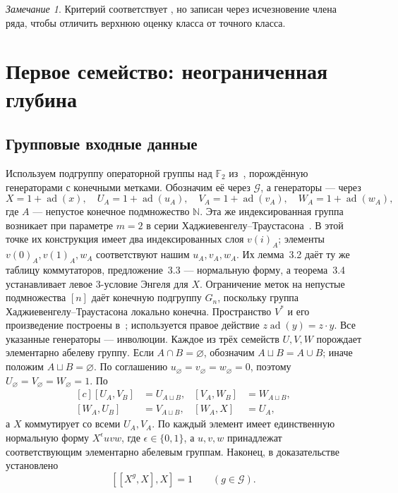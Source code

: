 \documentclass[11pt,a4paper]{article}
\theoremstyle{definition}
\theoremstyle{remark}
\newtheorem{remark}[theorem]{Замечание}
\newcommand{\ad}{\operatorname{ad}}
\newcommand{\F}{\mathbb F}
\begin{document}
\begin{remark}
Критерий соответствует \cite[предложение~3.2]{BCNW},
но записан через исчезновение члена ряда, чтобы отличить
верхнюю оценку класса от точного класса.
\end{remark}

\section{Первое семейство: неограниченная глубина}
\label{sec:first}

\subsection{Групповые входные данные}

Используем подгруппу операторной группы над \(\F_2\) из~\cite{NTT},
порождённую генераторами с конечными метками. Обозначим её
через \(\mathscr G\), а генераторы --- через
\[
 X=1+\ad(x),\quad U_A=1+\ad(u_A),\quad
 V_A=1+\ad(v_A),\quad W_A=1+\ad(w_A),
\]
где \(A\) --- непустое конечное подмножество \(\mathbb N\).
Эта же индексированная группа возникает при параметре \(m=2\)
в серии Хаджиевенгелу--Траустасона~\cite{HT}. В этой точке их конструкция
имеет два индексированных слоя \(v(i)_A\); элементы
\(v(0)_A,v(1)_A,w_A\) соответствуют нашим \(u_A,v_A,w_A\).
Их лемма~3.2 даёт ту же таблицу коммутаторов,
предложение~3.3 --- нормальную форму, а теорема~3.4 устанавливает
левое \(3\)-условие Энгеля для \(X\). Ограничение меток на непустые
подмножества \([n]\) даёт конечную подгруппу \(G_n\), поскольку
группа Хаджиевенгелу--Траустасона локально конечна.
Пространство \(V^*\) и его произведение построены
в~\cite[раздел~2, перед леммой~2.2]{NTT}; используется правое действие
\(z\ad(y)=z\cdot y\).
Все указанные генераторы --- инволюции.
Каждое из трёх семейств \(U,V,W\) порождает элементарно абелеву группу.
Если \(A\cap B=\varnothing\), обозначим \(A\sqcup B=A\cup B\);
иначе положим \(A\sqcup B=\varnothing\).
По соглашению \(u_\varnothing=v_\varnothing=w_\varnothing=0\),
поэтому \(U_\varnothing=V_\varnothing=W_\varnothing=1\).
По \cite[лемма~2.3]{NTT}
\begin{equation}\label{eq:nttcomm}
 \begin{aligned}[c]
 [U_A,V_B]&=U_{A\sqcup B},&
 [V_A,W_B]&=W_{A\sqcup B},\\
 [W_A,U_B]&=V_{A\sqcup B},&
 [W_A,X]&=U_A,
 \end{aligned}
\end{equation}
а \(X\) коммутирует со всеми \(U_A,V_A\).
По \cite[предложение~2.4]{NTT} каждый элемент имеет
единственную нормальную форму \(X^\epsilon uvw\),
где \(\epsilon\in\{0,1\}\), а \(u,v,w\) принадлежат
соответствующим элементарно абелевым группам.
Наконец, в доказательстве \cite[теорема~2.5]{NTT} установлено
\begin{equation}\label{eq:pairengel}
 [[X^g,X],X]=1\qquad(g\in\mathscr G).
\end{equation}
\end{document}
